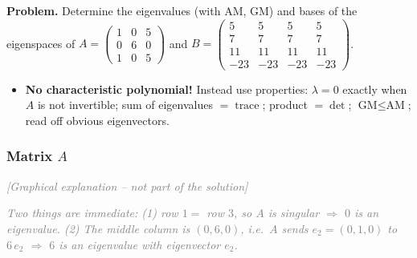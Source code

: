 \documentclass[a4paper,12pt]{article}
\newcommand{\grafik}{\textcolor{gray}{\small\textit{[Graphical explanation -- not part of the solution]}}}
\begin{document}
\textbf{Problem.} Determine the eigenvalues (with AM, GM) and bases of the eigenspaces of
$A = \begin{pmatrix} 1 & 0 & 5 \\ 0 & 6 & 0 \\ 1 & 0 & 5 \end{pmatrix}$ and
$B = \begin{pmatrix} 5 & 5 & 5 & 5 \\ 7 & 7 & 7 & 7 \\ 11 & 11 & 11 & 11 \\ -23 & -23 & -23 & -23 \end{pmatrix}$.

\begin{wastun}
\begin{itemize}[leftmargin=*, nosep]
    \item \textbf{No characteristic polynomial!} Instead use properties: $\lambda = 0$ exactly when $A$ is not invertible; sum of eigenvalues $= \operatorname{trace}$; product $= \det$; $\text{GM} \le \text{AM}$; read off obvious eigenvectors.
\end{itemize}
\end{wastun}

\subsubsection*{Matrix $A$}

\grafik

\begin{center}
\end{center}

\textcolor{gray}{\small\textit{Two things are immediate: (1) row $1 =$ row $3$, so $A$ is singular $\Rightarrow$ $0$ is an eigenvalue. (2) The middle column is $(0,6,0)$, i.e.\ $A$ sends $e_2 = (0,1,0)$ to $6\,e_2$ $\Rightarrow$ $6$ is an eigenvalue with eigenvector $e_2$.}}
\end{document}
